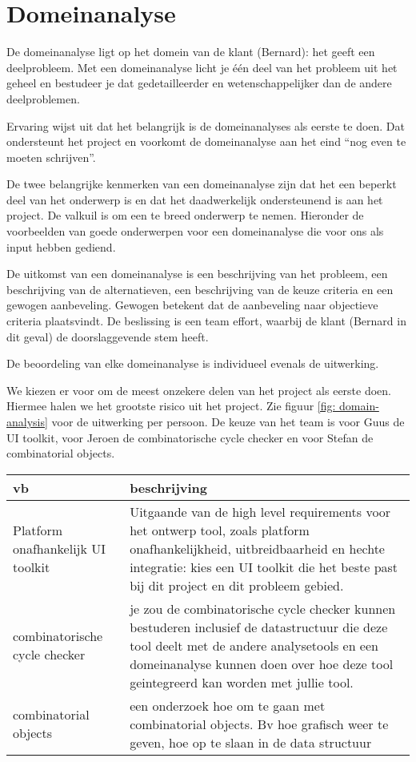 
\section{Domeinanalyse}

De domeinanalyse ligt op het domein van de klant (Bernard): het geeft een deelprobleem. Met een domeinanalyse licht je
\'e\'en deel van het probleem uit het geheel en bestudeer je dat gedetailleerder en wetenschappelijker dan de andere deelproblemen.

Ervaring wijst uit dat het belangrijk is de domeinanalyses als eerste te doen. Dat ondersteunt het project en voorkomt
de domeinanalyse aan het eind ``nog even te moeten schrijven''.

De twee belangrijke kenmerken van een domeinanalyse zijn dat het een beperkt deel van het onderwerp is en dat het daadwerkelijk
ondersteunend is aan het project. De valkuil is om een te breed onderwerp te nemen. Hieronder de voorbeelden van goede onderwerpen
voor een domeinanalyse die voor ons als input hebben gediend.

De uitkomst van een domeinanalyse is een beschrijving van het probleem,
een beschrijving van de alternatieven, een beschrijving van de keuze criteria en
een gewogen aanbeveling. Gewogen betekent dat de aanbeveling naar objectieve criteria plaatsvindt.
De beslissing is een team effort, waarbij de klant (Bernard in dit geval)
de doorslaggevende stem heeft.

De beoordeling van elke domeinanalyse is individueel evenals de uitwerking.

We kiezen er voor om de meest onzekere delen van het project als eerste doen. Hiermee halen we het grootste risico uit het
project. Zie figuur \ref{fig: domain-analysis} voor de uitwerking per persoon.
De keuze van het team is voor Guus de UI toolkit, voor Jeroen de combinatorische cycle checker en voor Stefan de combinatorial objects.

\begin{center}
    \begin{tabular}{|p{2.5cm}|p{10cm}|}
    \hline
        {\bf vb}		& {\bf beschrijving} \\\hline
        Platform onafhankelijk UI toolkit & Uitgaande van de high level requirements voor het ontwerp
					    tool, zoals platform onafhankelijkheid, uitbreidbaarheid
					    en hechte integratie: kies een UI toolkit die het
					    beste past bij dit project en dit probleem gebied.\\\hline
        combinatorische cycle checker & je zou de combinatorische cycle checker kunnen bestuderen inclusief de datastructuur die
					deze tool deelt met de andere analysetools en een domeinanalyse kunnen doen
					over hoe deze tool geintegreerd kan worden met jullie tool.\\\hline
        combinatorial objects &  een onderzoek hoe om te gaan met combinatorial objects.
				    Bv hoe grafisch weer te geven, hoe op te slaan in de data structuur\\\hline
    \end{tabular}
\end{center}



